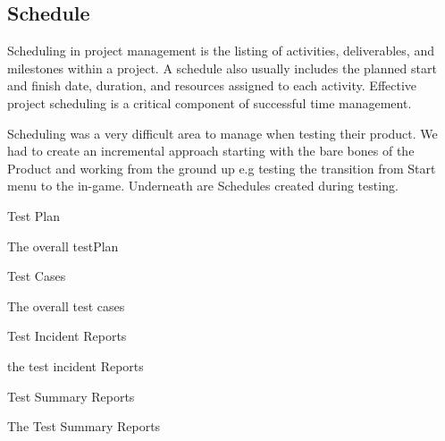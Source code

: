 
\subsection{Schedule}

Scheduling in project management is the listing of activities, deliverables, and milestones within a project. A schedule also usually includes the planned start and finish date, duration, and resources assigned to each activity. Effective project scheduling is a critical component of successful time management.

Scheduling was a very difficult area to manage when testing their product. We had to create an
incremental approach starting with the bare bones of the Product and working from the ground up
e.g testing the transition from Start menu to the in-game. Underneath are Schedules created during
testing.


\begin{center}
\centerline{Test Plan}
\end{center}
The overall testPlan



\begin{center}
\centerline{Test Cases}
\end{center}
The overall test cases


\begin{center}
\centerline{Test Incident Reports}
\end{center}
the test incident Reports



\begin{center}
\centerline{Test Summary Reports}
\end{center}
The Test Summary Reports
